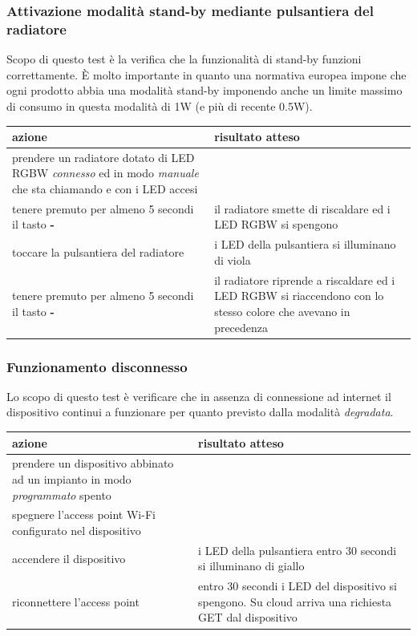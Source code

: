 \documentclass[a4paper,titlepage]{article}
\begin{document}
\subsubsection{Attivazione modalità stand-by mediante pulsantiera del radiatore}

Scopo di questo test è la verifica che la funzionalità di stand-by funzioni correttamente.
È molto importante in quanto una normativa europea impone che ogni prodotto abbia una
modalità stand-by imponendo anche un limite massimo di consumo in questa modalità di 1W
(e più di recente 0.5W).

\begin{center}
\begin{tabular}{| p{5cm} | p{5cm} |}
    \hline \textbf{azione} & \textbf{risultato atteso} \\
    \hline prendere un radiatore dotato di LED RGBW \textit{connesso} ed in modo \textit{manuale} che sta chiamando e con i LED accesi & \\
    \hline tenere premuto per almeno 5 secondi il tasto \textbf{-} & il radiatore smette di riscaldare ed i LED RGBW si spengono \\
    \hline toccare la pulsantiera del radiatore & i LED della pulsantiera si illuminano di viola \\
    \hline tenere premuto per almeno 5 secondi il tasto \textbf{-} & il radiatore riprende a riscaldare ed i LED RGBW si riaccendono con lo stesso colore che avevano in precedenza \\
    \hline
\end{tabular}
\end{center}

\subsubsection{Funzionamento disconnesso}

Lo scopo di questo test è verificare che in assenza di connessione ad internet il
dispositivo continui a funzionare per quanto previsto dalla modalità \textit{degradata}.

\begin{center}
\begin{tabular}{| p{5cm} | p{5cm} |}
    \hline \textbf{azione} & \textbf{risultato atteso} \\
    \hline prendere un dispositivo abbinato ad un impianto in modo \textit{programmato} spento & \\
    \hline spegnere l'access point Wi-Fi configurato nel dispositivo & \\
    \hline accendere il dispositivo & i LED della pulsantiera entro 30 secondi si illuminano di giallo \\
    \hline riconnettere l'access point & entro 30 secondi i LED del dispositivo si spengono. Su cloud arriva una richiesta GET dal dispositivo \\
    \hline
\end{tabular}
\end{center}
\end{document}
